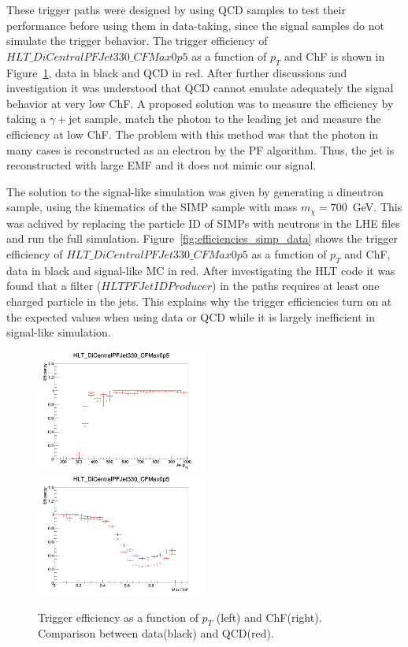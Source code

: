 These trigger paths were designed by using QCD samples to test their performance before using them in data-taking, since the signal samples do not simulate the trigger behavior. The trigger efficiency of $HLT\_DiCentralPFJet330\_CFMax0p5$ as a function of $p_{T}$ and ChF is shown in Figure~\ref{fig:efficiencies_qcd_data}, data in black and QCD in red. After further discussions and investigation it was understood that QCD cannot emulate adequately the signal behavior at very low ChF. A proposed solution was to measure the efficiency by taking a $\gamma+$jet sample, match the photon to the leading jet and measure the efficiency at low ChF. The problem with this method was that the photon in many cases is reconstructed as an electron by the PF algorithm. Thus, the jet is reconstructed with large EMF and it does not mimic our signal. 

The solution to the signal-like simulation was given by generating a dineutron sample, using the kinematics of the SIMP sample with mass $m_{\chi}=700$~GeV. This was achived by replacing the particle ID of SIMPs with neutrons in the LHE files and run the full simulation. Figure~\ref{fig:efficiencies_simp_data} shows the trigger efficiency of $HLT\_DiCentralPFJet330\_CFMax0p5$ as a function of $p_{T}$ and ChF, data in black and signal-like MC in red. After investigating the HLT code it was found that a filter ($HLTPFJetIDProducer$) in the paths requires at least one charged particle in the jets. This explains why the trigger efficiencies turn on at the expected values when using data or QCD while it is largely inefficient in signal-like simulation.




\begin{figure}[h]
  \centering
  \includegraphics[width=0.5\textwidth]{figures/trigger/pt_eff_05_DataMC.png}\hfill%
  \includegraphics[width=0.5\textwidth]{figures/trigger/chf_eff_05_DataMC.png}
  \caption{Trigger efficiency as a function of $p_{T}$ (left) and ChF(right). Comparison between data(black) and QCD(red). }
  \label{fig:efficiencies_qcd_data}
\end{figure}


